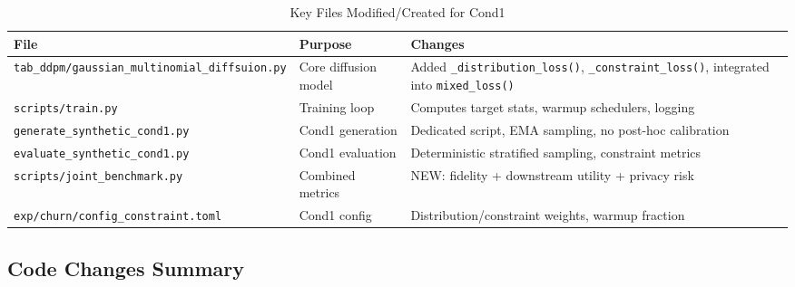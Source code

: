 \documentclass{article}
\begin{document}
\begin{table}[ht]
\centering
\caption{Key Files Modified/Created for Cond1}
\label{tab:files}
\begin{tabular}{lp{4cm}p{4cm}}
\toprule
File & Purpose & Changes \\
\midrule
\texttt{tab\_ddpm/gaussian\_multinomial\_diffsuion.py} & Core diffusion model & Added \texttt{\_distribution\_loss()}, \texttt{\_constraint\_loss()}, integrated into \texttt{mixed\_loss()} \\

\texttt{scripts/train.py} & Training loop & Computes target stats, warmup schedulers, logging \\

\texttt{generate\_synthetic\_cond1.py} & Cond1 generation & Dedicated script, EMA sampling, no post-hoc calibration \\

\texttt{evaluate\_synthetic\_cond1.py} & Cond1 evaluation & Deterministic stratified sampling, constraint metrics \\

\texttt{scripts/joint\_benchmark.py} & Combined metrics & NEW: fidelity + downstream utility + privacy risk \\

\texttt{exp/churn/config\_constraint.toml} & Cond1 config & Distribution/constraint weights, warmup fraction \\
\bottomrule
\end{tabular}
\end{table}

\subsection{Code Changes Summary}
\end{document}
